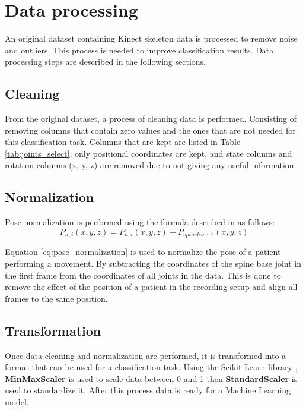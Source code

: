     \section{Data processing}

        An original dataset containing Kinect skeleton data is processed to remove noise and outliers. This process is needed to improve classification results. Data processing steps are described in the following sections.
        
        \subsection{Cleaning}
        
        From the original dataset, a process of cleaning data is performed. Consisting of removing columns that contain zero values and the ones that are not needed for this classification task. Columns that are kept are listed in Table \ref{tab:joints_select}, only positional coordinates are kept, and state columns and rotation columns (x, y, z) are removed due to not giving any useful information.

        \subsection{Normalization}

        Pose normalization is performed using the formula described in \cite{maudsley-barton_comparative_2017} as follows:
        \begin{equation}
            P_{n,i}(x,y,z) = P_{n,i}(x,y,z)-P_{spinebase,1}(x,y,z)
            \label{eq:pose_normalization}
        \end{equation}

        Equation \ref{eq:pose_normalization} is used to normalize the pose of a patient performing a movement. By subtracting the coordinates of the spine base joint in the first frame from the coordinates of all joints in the data. This is done to remove the effect of the position of a patient in the recording setup and align all frames to the same position. 

        \subsection{Transformation}

        Once data cleaning and normalization are performed, it is transformed into a format that can be used for a classification task. Using the Scikit Learn library \cite{sklearn_api}, \textbf{MinMaxScaler} is used to scale data between 0 and 1 then \textbf{StandardScaler} is used to standardize it. After this process data is ready for a Machine Learning model.

\cleardoublepage
